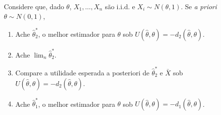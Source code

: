 \begin{exercise}
 Considere que, dado $\theta$, 
 $X_{1},\ldots,X_{n}$ são i.i.d. e
 $X_{i} \sim N(\theta,1)$. 
 Se \emph{a priori} $\theta \sim N(0,1)$,
 \begin{enumerate}[label=(\alph*)]
  \item Ache $\hat{\theta}^{*}_{2}$, 
  o melhor estimador para $\theta$ sob 
  $U(\hat{\theta},\theta)=-d_{2}(\hat{\theta},\theta)$.
  \item Ache $\lim_{n}\hat{\theta}^{*}_{2}$.
  \item Compare a utilidade esperada a posteriori 
  de $\hat{\theta}^{*}_{2}$ e $\bar{X}$ sob
  $U(\hat{\theta},\theta)=-d_{2}(\hat{\theta},\theta)$.
  \item Ache $\hat{\theta}^{*}_{1}$, 
  o melhor estimador para $\theta$ sob 
  $U(\hat{\theta},\theta)=-d_{1}(\hat{\theta},\theta)$.
 \end{enumerate}
\end{exercise}

